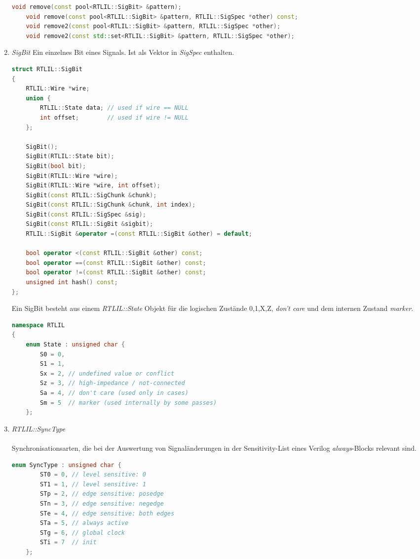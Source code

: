 \documentclass[11pt]{report}
\begin{document}
\begin{enumerate}
\begin{lstlisting}[language=C++]
	void remove(const pool<RTLIL::SigBit> &pattern);
	void remove(const pool<RTLIL::SigBit> &pattern, RTLIL::SigSpec *other) const;
	void remove2(const pool<RTLIL::SigBit> &pattern, RTLIL::SigSpec *other);
	void remove2(const std::set<RTLIL::SigBit> &pattern, RTLIL::SigSpec *other);
\end{lstlisting}

\item{\textit{SigBit}}
Ein einzelnes Bit eines Signals. Ist als Vektor in \textit{SigSpec} enthalten.
\begin{lstlisting}[language=C++]
struct RTLIL::SigBit
{
	RTLIL::Wire *wire;
	union {
		RTLIL::State data; // used if wire == NULL
		int offset;        // used if wire != NULL
	};

	SigBit();
	SigBit(RTLIL::State bit);
	SigBit(bool bit);
	SigBit(RTLIL::Wire *wire);
	SigBit(RTLIL::Wire *wire, int offset);
	SigBit(const RTLIL::SigChunk &chunk);
	SigBit(const RTLIL::SigChunk &chunk, int index);
	SigBit(const RTLIL::SigSpec &sig);
	SigBit(const RTLIL::SigBit &sigbit);
	RTLIL::SigBit &operator =(const RTLIL::SigBit &other) = default;

	bool operator <(const RTLIL::SigBit &other) const;
	bool operator ==(const RTLIL::SigBit &other) const;
	bool operator !=(const RTLIL::SigBit &other) const;
	unsigned int hash() const;
};
\end{lstlisting}

Ein SigBit besteht aus einem \textit{RTLIL::State} Objekt für die logischen Zustände 0,1,X,Z, \textit{don't care} und dem internen Zustand \textit{marker}.
\begin{lstlisting}[language=C++]
namespace RTLIL
{
	enum State : unsigned char {
		S0 = 0,
		S1 = 1,
		Sx = 2, // undefined value or conflict
		Sz = 3, // high-impedance / not-connected
		Sa = 4, // don't care (used only in cases)
		Sm = 5  // marker (used internally by some passes)
	};
\end{lstlisting}
\item \textit{RTLIL::SyncType}\\
\\
Synchronisationsarten, die bei der Auswertung von Signaländerungen in der Sensitivity-List eines Verilog \textit{always}-Blocks relevant sind.
\begin{lstlisting}[language=C++]
	enum SyncType : unsigned char {
		ST0 = 0, // level sensitive: 0
		ST1 = 1, // level sensitive: 1
		STp = 2, // edge sensitive: posedge
		STn = 3, // edge sensitive: negedge
		STe = 4, // edge sensitive: both edges
		STa = 5, // always active
		STg = 6, // global clock
		STi = 7  // init
	};
\end{lstlisting}



\end{enumerate}
\end{document}
